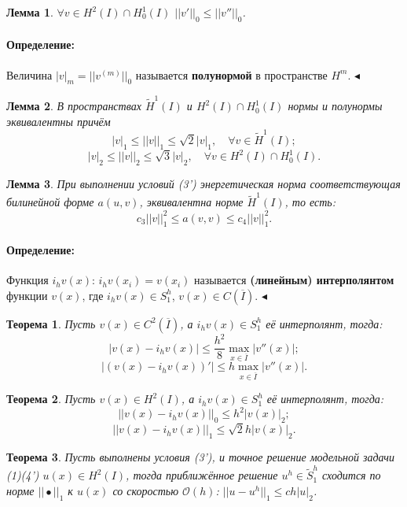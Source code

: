 \documentclass{article}
\newtheorem{theorem}{Теорема}
\newtheorem{lemma}{Лемма}
\newenvironment{definition}{ \paragraph{Определение:}}{\hfill $\blacktriangleleft$}
\begin{document}
\begin{lemma}
	$\forall v \in H^2(I) \cap H_0^1(I)$ $||v'||_0 \leqslant ||v''||_0$.
\end{lemma}

\begin{definition}
	Величина $|v|_m = ||v^{(m)}||_0$ называется \textbf{полунормой} в пространстве $H^m$.
\end{definition}

\begin{lemma}
	В пространствах $\tilde{H}^1(I)$ и $H^2(I) \cap H_0^1(I)$ нормы и полунормы эквивалентны причём
	\[
	|v|_1 \leqslant ||v||_1 \leqslant \sqrt{2} |v|_1, \quad \forall v \in \tilde{H}^1(I);	
	\]
	\[
	|v|_2 \leqslant ||v||_2 \leqslant \sqrt{3} |v|_2, \quad \forall v \in H^2(I) \cap H_0^1(I).
	\]
\end{lemma}

\begin{lemma}
	При выполнении условий (3') энергетическая норма соответствующая билинейной форме $a(u,v)$, эквивалентна норме $\tilde{H}^1(I)$, то есть:
	\[
	c_3 ||v||_1^2 \leqslant a(v,v) \leqslant c_4 ||v||_1^2. 	
	\]
\end{lemma}

\begin{definition}
	Функция $i_h v(x)$: $i_h v(x_i)= v(x_i)$ называется \textbf{(линейным) интерполянтом} функции $v(x)$, где $i_h v(x) \in S_1^h$, $v(x) \in C(\overline{I})$.
\end{definition}

\begin{theorem}
	Пусть $v(x) \in C^2(\overline{I})$, а $i_h v(x) \in S_1^h$ её интерполянт, тогда:
	\[
	|v(x) - i_h v(x)| \leqslant \dfrac{h^2}{8} \max\limits_{x \in \overline{I}} |v''(x)|;	
	\]
	\[
	|(v(x) - i_h v(x))'| \leqslant h \max\limits_{x \in \overline{I}} |v''(x)|.
	\]
\end{theorem}

\begin{theorem}
	Пусть $v(x) \in H^2(I)$, а $i_h v(x) \in S_1^h$ её интерполянт, тогда:
	\[
	||v(x) - i_h v(x)||_0 \leqslant h^2 |v(x)|_2;	
	\]
	\[
	||v(x) - i_h v(x)||_1 \leqslant \sqrt{2}h |v(x)|_2.
	\]
\end{theorem}

\begin{theorem}
	Пусть выполнены условия (3'), и точное решение модельной задачи (1)(4') $u(x) \in H^2(I)$, тогда приближённое решение $u^h \in \tilde{S}_1^h$ сходится по норме $||\bullet||_1$ к $u(x)$ со скоростью $\mathcal{O}(h)$: $||u-u^h||_1 \leqslant c h |u|_2$.
\end{theorem}
\end{document}
